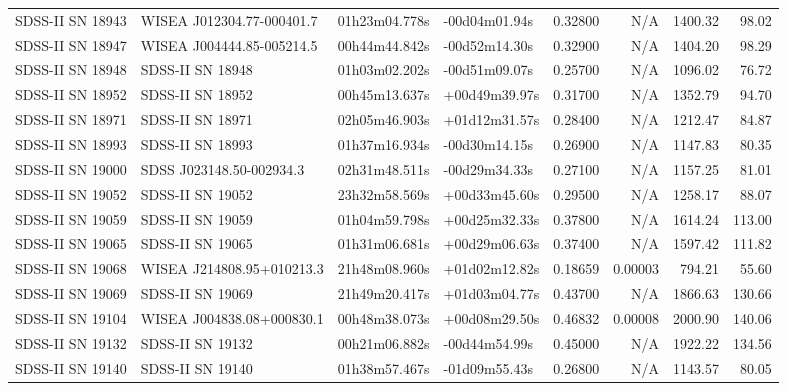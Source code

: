 \begin{longtable}{llllrrrr}
SDSS-II SN 18943 &       WISEA J012304.77-000401.7 &   01h23m04.778s &   -00d04m01.94s &  0.32800 &      N/A &  1400.32 &       98.02 \\
SDSS-II SN 18947 &       WISEA J004444.85-005214.5 &   00h44m44.842s &   -00d52m14.30s &  0.32900 &      N/A &  1404.20 &       98.29 \\
SDSS-II SN 18948 &                SDSS-II SN 18948 &   01h03m02.202s &   -00d51m09.07s &  0.25700 &      N/A &  1096.02 &       76.72 \\
SDSS-II SN 18952 &                SDSS-II SN 18952 &   00h45m13.637s &   +00d49m39.97s &  0.31700 &      N/A &  1352.79 &       94.70 \\
SDSS-II SN 18971 &                SDSS-II SN 18971 &   02h05m46.903s &   +01d12m31.57s &  0.28400 &      N/A &  1212.47 &       84.87 \\
SDSS-II SN 18993 &                SDSS-II SN 18993 &   01h37m16.934s &   -00d30m14.15s &  0.26900 &      N/A &  1147.83 &       80.35 \\
SDSS-II SN 19000 &        SDSS J023148.50-002934.3 &   02h31m48.511s &   -00d29m34.33s &  0.27100 &      N/A &  1157.25 &       81.01 \\
SDSS-II SN 19052 &                SDSS-II SN 19052 &   23h32m58.569s &   +00d33m45.60s &  0.29500 &      N/A &  1258.17 &       88.07 \\
SDSS-II SN 19059 &                SDSS-II SN 19059 &   01h04m59.798s &   +00d25m32.33s &  0.37800 &      N/A &  1614.24 &      113.00 \\
SDSS-II SN 19065 &                SDSS-II SN 19065 &   01h31m06.681s &   +00d29m06.63s &  0.37400 &      N/A &  1597.42 &      111.82 \\
SDSS-II SN 19068 &       WISEA J214808.95+010213.3 &   21h48m08.960s &   +01d02m12.82s &  0.18659 &  0.00003 &   794.21 &       55.60 \\
SDSS-II SN 19069 &                SDSS-II SN 19069 &   21h49m20.417s &   +01d03m04.77s &  0.43700 &      N/A &  1866.63 &      130.66 \\
SDSS-II SN 19104 &       WISEA J004838.08+000830.1 &   00h48m38.073s &   +00d08m29.50s &  0.46832 &  0.00008 &  2000.90 &      140.06 \\
SDSS-II SN 19132 &                SDSS-II SN 19132 &   00h21m06.882s &   -00d44m54.99s &  0.45000 &      N/A &  1922.22 &      134.56 \\
SDSS-II SN 19140 &                SDSS-II SN 19140 &   01h38m57.467s &   -01d09m55.43s &  0.26800 &      N/A &  1143.57 &       80.05 \\

\end{longtable}
